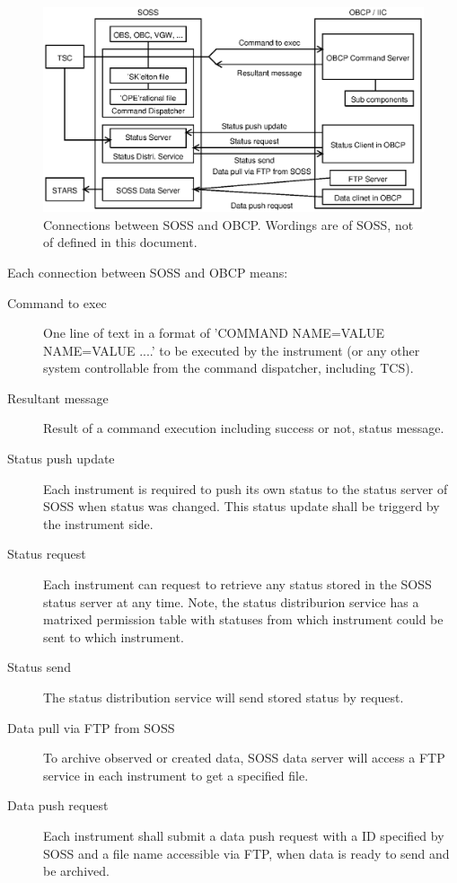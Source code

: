 \documentclass[a4paper,notitlepage]{article}
\begin{document}
\begin{figure}[htb]
  \begin{center}
    \includegraphics[scale=0.75]{ics-soss-connection.eps}
  \end{center}
  \caption{Connections between SOSS and OBCP. Wordings are of SOSS, not of 
      defined in this document.}
  \label{fig:ics-soss-connection}
\end{figure}

Each connection between SOSS and OBCP means: 

\begin{description}
  \item[Command to exec] One line of text in a format of 'COMMAND NAME=VALUE 
    NAME=VALUE ....' to be executed by the instrument (or any other system 
    controllable from the command dispatcher, including TCS). 
  \item[Resultant message] Result of a command execution including success or 
    not, status message.
  \item[Status push update] Each instrument is required to push its own status 
    to the status server of SOSS when status was changed. This status update 
    shall be triggerd by the instrument side.
  \item[Status request] Each instrument can request to retrieve any status 
    stored in the SOSS status server at any time. Note, the status distriburion 
    service has a matrixed permission table with statuses from which instrument 
    could be sent to which instrument. 
  \item[Status send] The status distribution service will send stored status 
    by request. 
  \item[Data pull via FTP from SOSS] To archive observed or created data, 
    SOSS data server will access a FTP service in each instrument to get 
    a specified file. 
  \item[Data push request] Each instrument shall submit a data push request 
    with a ID specified by SOSS and a file name accessible via FTP, when data 
    is ready to send and be archived. 
\end{description}
\end{document}
